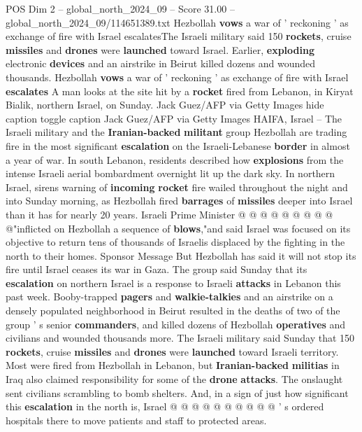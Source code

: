 \begin{textsample}{POS Dim 2 – global\_north\_2024\_09 – Score 31.00 – global\_north\_2024\_09/114651389.txt}  \label{ex:f2_pos_124}
Hezbollah \textbf{vows} a war of ' reckoning ' as exchange of fire with Israel escalatesThe Israeli military said 150 \textbf{rockets}, cruise \textbf{missiles} and \textbf{drones} were \textbf{launched} toward Israel.
Earlier, \textbf{exploding} electronic \textbf{devices} and an airstrike in Beirut killed dozens and wounded thousands.
Hezbollah \textbf{vows} a war of ' reckoning ' as exchange of fire with Israel \textbf{escalates} A man looks at the site hit by a \textbf{rocket} fired from Lebanon, in Kiryat Bialik, northern Israel, on Sunday.
Jack Guez/AFP via Getty Images hide caption toggle caption Jack Guez/AFP via Getty Images HAIFA, Israel -- The Israeli military and the \textbf{Iranian-backed} \textbf{militant} group Hezbollah are trading fire in the most significant \textbf{escalation} on the Israeli-Lebanese \textbf{border} in almost a year of war.
In south Lebanon, residents described how \textbf{explosions} from the intense Israeli aerial bombardment overnight lit up the dark sky.
In northern Israel, sirens warning of \textbf{incoming} \textbf{rocket} fire wailed throughout the night and into Sunday morning, as Hezbollah fired \textbf{barrages} of \textbf{missiles} deeper into Israel than it has for nearly 20 years.
Israeli Prime Minister @ @ @ @ @ @ @ @ @ @"inflicted on Hezbollah a sequence of \textbf{blows},"and said Israel was focused on its objective to return tens of thousands of Israelis displaced by the fighting in the north to their homes.
Sponsor Message But Hezbollah has said it will not stop its fire until Israel ceases its war in Gaza.
The group said Sunday that its \textbf{escalation} on northern Israel is a response to Israeli \textbf{attacks} in Lebanon this past week.
Booby-trapped \textbf{pagers} and \textbf{walkie-talkies} and an airstrike on a densely populated neighborhood in Beirut resulted in the deaths of two of the group ' s senior \textbf{commanders}, and killed dozens of Hezbollah \textbf{operatives} and civilians and wounded thousands more.
The Israeli military said Sunday that 150 \textbf{rockets}, cruise \textbf{missiles} and \textbf{drones} were \textbf{launched} toward Israeli territory.
Most were fired from Hezbollah in Lebanon, but \textbf{Iranian-backed} \textbf{militias} in Iraq also claimed responsibility for some of the \textbf{drone} \textbf{attacks}.
The onslaught sent civilians scrambling to bomb shelters.
And, in a sign of just how significant this \textbf{escalation} in the north is, Israel @ @ @ @ @ @ @ @ @ @ ' s ordered hospitals there to move patients and staff to protected areas.

\end{textsample}
